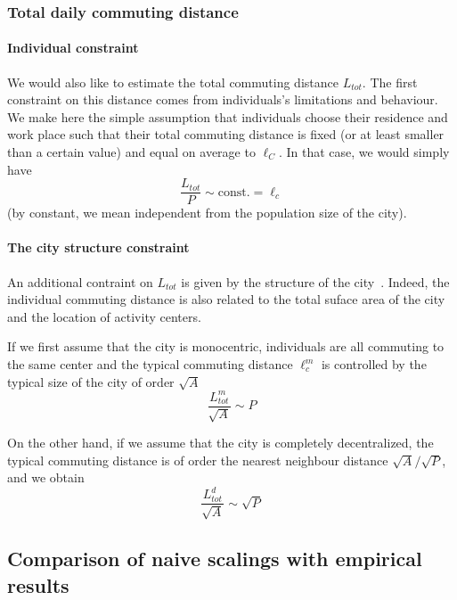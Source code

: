 \subsubsection{Total daily commuting distance} 

\paragraph{Individual constraint} We would also like to estimate the total commuting distance $L_{tot}$. The first constraint on this distance comes from individuals's limitations and behaviour. We make here the simple assumption that individuals choose their residence and work place such that their total commuting distance is fixed (or at least smaller than a certain value) and equal on average to $\ell_C$. In that case, we would simply have
%
\begin{equation}
  \frac{L_{tot}}{P} \sim \text{const.} = \ell_c
\label{eq:assum}
\end{equation}
(by constant, we mean independent from the population size of the city).

\paragraph{The city structure constraint} An additional contraint on $L_{tot}$ is given by the structure of the city~\cite{Samaniego:2008}. Indeed, the individual commuting distance is also related to the total suface area of the city and the location of activity centers.

If we first assume that the city is monocentric, individuals are all commuting to the same center and the typical commuting distance $\ell^m_c$ is controlled by the typical size of the city of order $\sqrt{A}$ 
%
\begin{equation}
\frac{L_{tot}^{m}}{\sqrt{A}} \sim P
\end{equation}

On the other hand, if we assume that the city is completely decentralized, the typical commuting distance is of order the nearest neighbour distance $\sqrt{A}/\sqrt{P}$, and we obtain
%
\begin{equation}
\frac{L_{tot}^{d}}{\sqrt{A}} \sim \sqrt{P}
\end{equation}


\subsection{Comparison of naive scalings with empirical results}


